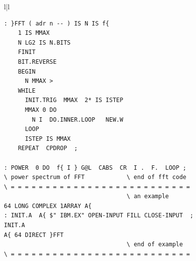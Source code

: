 \begin{figure}[H]
\begin{tabular}{l|l}
\begin{lstlisting}
: }FFT ( adr n -- ) IS N IS f{
    1 IS MMAX
    N LG2 IS N.BITS
    FINIT
    BIT.REVERSE
    BEGIN
      N MMAX >
    WHILE
      INIT.TRIG  MMAX  2* IS ISTEP
      MMAX 0 DO
        N I  DO.INNER.LOOP   NEW.W
      LOOP
      ISTEP IS MMAX
    REPEAT  CPDROP  ;

: POWER  0 DO  f{ I } G@L  CABS  CR  I .  F.  LOOP ;
\ power spectrum of FFT            \ end of fft code
\ = = = = = = = = = = = = = = = = = = = = = = = = = =
                                   \ an example
64 LONG COMPLEX 1ARRAY A{
: INIT.A  A{ $" IBM.EX" OPEN-INPUT FILL CLOSE-INPUT  ;
INIT.A
A{ 64 DIRECT }FFT
                                   \ end of example
\ = = = = = = = = = = = = = = = = = = = = = = = = = =
        \end{lstlisting}
    \end{tabular}
\end{figure}